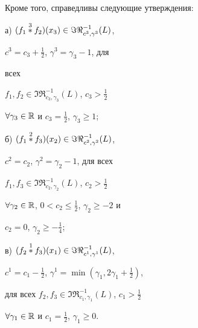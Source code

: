 Кроме того, справедливы следующие утверждения: 


 


а) $(f_1\overset{3}{*}{}f_2)(x_3)\in\Im\Re^{-1}_{c^3,\gamma^3}(L)$, 


$c^3=c_3+\frac{1}{2}$, $\gamma^3=\gamma_3-1$, для 


всех 


$f_1,f_2\in\Im\Re^{-1}_{c_3,\gamma_3}(L)$, $c_3>\frac{1}{2}$ 


$\forall\gamma_3\in\Bbb R$ и $c_3=\frac{1}{2}$, $\gamma_3\ge1$; 


 


б) $(f_1\overset{2}{*}{}f_3)(x_2)\in\Im\Re^{-1}_{c^2,\gamma^2}(L)$, 


$c^2=c_2$, $\gamma^2=\gamma_2-1$, для всех 


$f_1,f_3\in\Im\Re^{-1}_{c_2,\gamma_2}(L)$, $c_2>\frac{1}{2}$ 


$\forall\gamma_2\in\Bbb R$, $0<c_2\le\frac{1}{2}$, $\gamma_2\ge-2$ и 


$c_2=0$, $\gamma_2\ge-\frac{1}{4}$; 


 


в) $(f_2\overset{1}{*}{}f_3)(x_1)\in\Im\Re^{-1}_{c^1,\gamma^1}(L)$, 


$c^1=c_1-\frac{1}{2}$, $\gamma^1=\min(\gamma_1,2\gamma_1+\frac{1}{2})$, 


для всех $f_2,f_3\in\Im\Re^{-1}_{c_1,\gamma_1}(L)$, $c_1>\frac{1}{2}$ 


$\forall\gamma_1\in\Bbb R$ и $c_1=\frac{1}{2}$, $\gamma_1\ge0$. 


 


